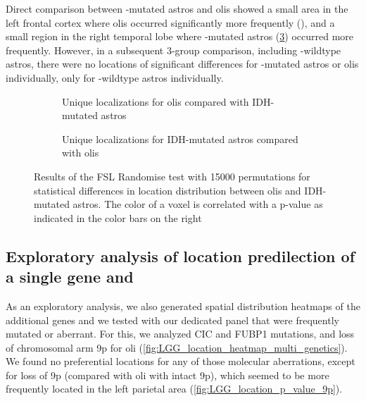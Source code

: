 Direct comparison between -mutated \glspl{astro} and \glspl{oli} showed a small area in the left frontal cortex where \glspl{oli} occurred significantly more frequently (), and a small region in the right temporal lobe where -mutated \glspl{astro} (\cref{fig:LGG_location_oligo_astro_p_value}) occurred more frequently.
However, in a subsequent 3-group comparison, including -wildtype \glspl{astro}, there were no locations of significant differences for -mutated \glspl{astro} or \glspl{oli} individually, only for -wildtype \glspl{astro} individually.

\begin{figure}[htbp]
    \centering
    \begin{subfigure}[b]{\textwidth}
        \caption{Unique localizations for \glspl{oli} compared with \acrshort{IDH}-mutated \glspl{astro}}\label{fig:LGG_location_p_values_1p19q_codeleted_vs_intact_codeleted}
    \end{subfigure}
    \begin{subfigure}[b]{\textwidth}
        \caption{Unique localizations for \acrshort{IDH}-mutated \glspl{astro} compared with \glspl{oli}}\label{fig:LGG_location_p_values_1p19q_codeleted_vs_intact_intact}
    \end{subfigure}
    \caption{Results of the \acrshort{FSL} Randomise test with \num{15000} permutations for statistical differences in location distribution between \glspl{oli} and \acrshort{IDH}-mutated \glspl{astro}.
    The color of a voxel is correlated with a p-value as indicated in the color bars on the right}\label{fig:LGG_location_oligo_astro_p_value}
\end{figure}

\subsection{Exploratory analysis of location predilection of a single gene and }

As an exploratory analysis, we also generated spatial distribution heatmaps of the additional genes and  we tested with our dedicated  panel that were frequently mutated or aberrant.
For this, we analyzed CIC and FUBP1 mutations, and loss of chromosomal arm 9p for \gls{oli} (\cref{fig:LGG_location_heatmap_multi_genetics}).
We found no preferential locations for any of those molecular aberrations, except for loss of 9p (compared with \gls{oli} with intact 9p), which seemed to be more frequently located in the left parietal area (\cref{fig:LGG_location_p_value_9p}).

